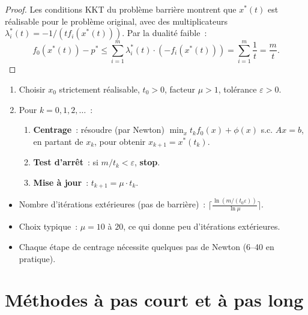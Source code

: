 \begin{proof}
Les conditions KKT du probl\`eme barri\`ere montrent que $x^*(t)$ est
r\'ealisable pour le probl\`eme original, avec des multiplicateurs
$\lambda_i^*(t) = -1/(t f_i(x^*(t)))$. Par la dualit\'e faible~:
\[
  f_0(x^*(t)) - p^* \leq \sum_{i=1}^m \lambda_i^*(t) \cdot (-f_i(x^*(t)))
  = \sum_{i=1}^m \frac{1}{t} = \frac{m}{t}.
\]
\end{proof}

\begin{algorithme}[title=\textbf{M\'ethode de barri\`ere}]
\begin{enumerate}
  \item Choisir $x_0$ strictement r\'ealisable, $t_0 > 0$,
        facteur $\mu > 1$, tol\'erance $\varepsilon > 0$.
  \item Pour $k = 0, 1, 2, \ldots$~:
    \begin{enumerate}
      \item \textbf{Centrage}~: r\'esoudre (par Newton)
            $\min_x t_k f_0(x) + \phi(x)$ s.c. $Ax = b$,
            en partant de $x_k$, pour obtenir $x_{k+1} = x^*(t_k)$.
      \item \textbf{Test d'arr\^et}~: si $m / t_k < \varepsilon$,
            \textbf{stop}.
      \item \textbf{Mise \`a jour}~: $t_{k+1} = \mu \cdot t_k$.
    \end{enumerate}
\end{enumerate}
\end{algorithme}

\begin{formules}[title=\textbf{Complexit\'e de la m\'ethode de barri\`ere}]
\begin{itemize}
  \item Nombre d'it\'erations ext\'erieures (pas de barri\`ere)~:
        $\lceil \frac{\ln(m / (t_0 \varepsilon))}{\ln \mu} \rceil$.
  \item Choix typique~: $\mu = 10$ \`a $20$, ce qui donne peu d'it\'erations
        ext\'erieures.
  \item Chaque \'etape de centrage n\'ecessite quelques pas de Newton (6--40
        en pratique).
\end{itemize}
\end{formules}

\section{M\'ethodes \`a pas court et \`a pas long}

